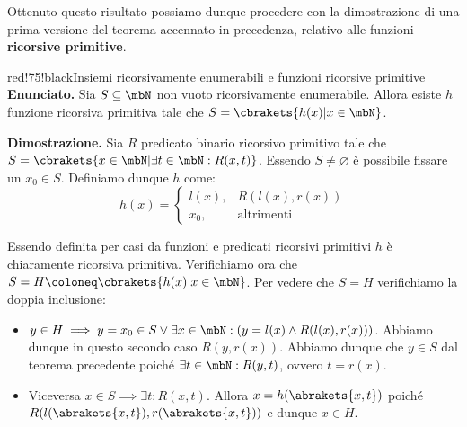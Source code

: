 Ottenuto questo risultato possiamo dunque procedere con la dimostrazione di una prima versione del teorema accennato in precedenza, relativo alle funzioni \textbf{ricorsive primitive}.
\begin{halfframedbox}{red!75!black}{Insiemi ricorsivamente enumerabili e funzioni ricorsive primitive}
  \textbf{Enunciato. } Sia \(S \subseteq \mbN\) non vuoto ricorsivamente enumerabile. Allora esiste \(h\) funzione ricorsiva primitiva tale che \(S=\cbrakets{h(x) | x \in \mbN}\).
  \begin{center}
    \textcolor{red!75!black}{\hdashrule[0.5ex]{18cm}{1pt}{3mm 3pt 1mm 2pt}}
  \end{center}
  \textbf{Dimostrazione. } Sia \(R\) predicato binario ricorsivo primitivo tale che \(S=\cbrakets{ x \in \mbN \vert \exists t \in \mbN: R(x,t)}\). Essendo \(S \neq \varnothing \) è possibile fissare un \(x_0 \in S\). Definiamo dunque \(h\) come:
  \begin{equation}
    h(x) = \begin{cases}
      l(x), & R(l(x),r(x))\\
      x_0, & \text{altrimenti}
    \end{cases}
  \end{equation}

  Essendo definita per casi da funzioni e predicati ricorsivi primitivi \(h\) è chiaramente ricorsiva primitiva. Verifichiamo ora che \(S= H \coloneq\cbrakets{h(x) | x \in \mbN}\).
  Per vedere che \(S=H\) verifichiamo la doppia inclusione:
  \begin{itemize}
    \item[\(\subseteq\)] \(y \in H \implies y=x_0 \in S \lor \exists x \in \mbN: \left(y=l(x) \land R(l(x),r(x))\right)\). Abbiamo dunque in questo secondo caso \(R(y,r(x))\). Abbiamo dunque che \(y\in S\) dal teorema precedente poiché \(\exists t \in \mbN: R(y,t)\), ovvero \(t=r(x)\).
    \item[\(\supseteq\)]  Viceversa \(x \in S \implies \exists t : R(x,t)\). Allora \(x=h(\abrakets{ x,t })\) poiché \(R(l(\abrakets{ x,t }),r(\abrakets{ x,t }))\) e dunque \(x \in H\).
  \end{itemize}
\end{halfframedbox}

\newpage

